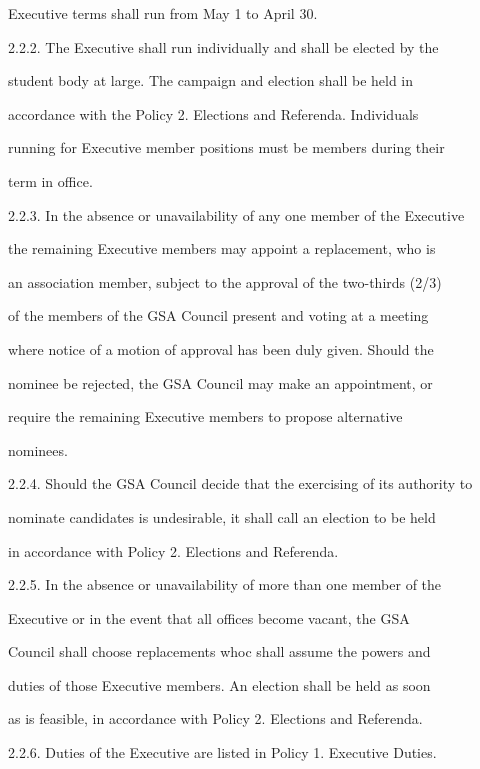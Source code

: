 \documentclass{article}
\begin{document}
Executive terms shall run from May 1 to April 30.  



2.2.2. The  Executive  shall  run  individually  and  shall  be  elected  by  the  

student  body  at  large.  The  campaign  and  election  shall  be  held  in  

accordance  with  the  Policy  2.  Elections  and  Referenda.  Individuals  

running for Executive member positions must be members during their  

term in office.  



2.2.3. In the absence or unavailability of any one member of the Executive  

the remaining Executive members may appoint a replacement, who is  

an association member, subject to the approval of the two-thirds (2/3)  

of the members of the GSA Council present and voting at a meeting  

where notice of a motion of approval has been duly given. Should the  

nominee be rejected, the GSA Council may make an appointment, or  

require   the   remaining   Executive   members   to   propose   alternative  

nominees.  



2.2.4.  Should the GSA Council decide that the exercising of its authority to  

nominate candidates is undesirable, it shall call an election to  be held  

in accordance with Policy 2. Elections and Referenda.  



2.2.5. In  the  absence  or  unavailability  of  more  than  one  member  of  the  

Executive  or  in  the  event  that  all  offices  become  vacant,  the  GSA  

Council shall choose replacements whoc shall assume the powers and  

duties of those Executive members. An election shall be held as soon  

as is feasible, in accordance with Policy 2. Elections and Referenda.  



2.2.6. Duties of the Executive are listed in Policy 1. Executive Duties.  
\end{document}
